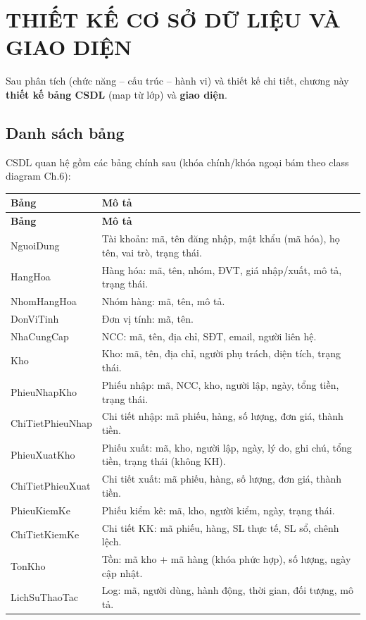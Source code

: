 \chapter{THIẾT KẾ CƠ SỞ DỮ LIỆU VÀ GIAO DIỆN}

Sau phân tích (chức năng -- cấu trúc -- hành vi) và thiết kế chi tiết, chương này \textbf{thiết kế bảng CSDL} (map từ lớp) và \textbf{giao diện}.

\section{Danh sách bảng}

CSDL quan hệ gồm các bảng chính sau (khóa chính/khóa ngoại bám theo class diagram Ch.6):

\begin{longtable}{|p{3.5cm}|p{9.5cm}|}
\hline
\textbf{Bảng} & \textbf{Mô tả} \\
\hline
\endfirsthead
\hline
\textbf{Bảng} & \textbf{Mô tả} \\
\hline
\endhead
NguoiDung & Tài khoản: mã, tên đăng nhập, mật khẩu (mã hóa), họ tên, vai trò, trạng thái. \\
\hline
HangHoa & Hàng hóa: mã, tên, nhóm, ĐVT, giá nhập/xuất, mô tả, trạng thái. \\
\hline
NhomHangHoa & Nhóm hàng: mã, tên, mô tả. \\
\hline
DonViTinh & Đơn vị tính: mã, tên. \\
\hline
NhaCungCap & NCC: mã, tên, địa chỉ, SĐT, email, người liên hệ. \\
\hline
Kho & Kho: mã, tên, địa chỉ, người phụ trách, diện tích, trạng thái. \\
\hline
PhieuNhapKho & Phiếu nhập: mã, NCC, kho, người lập, ngày, tổng tiền, trạng thái. \\
\hline
ChiTietPhieuNhap & Chi tiết nhập: mã phiếu, hàng, số lượng, đơn giá, thành tiền. \\
\hline
PhieuXuatKho & Phiếu xuất: mã, kho, người lập, ngày, lý do, ghi chú, tổng tiền, trạng thái (không KH). \\
\hline
ChiTietPhieuXuat & Chi tiết xuất: mã phiếu, hàng, số lượng, đơn giá, thành tiền. \\
\hline
PhieuKiemKe & Phiếu kiểm kê: mã, kho, người kiểm, ngày, trạng thái. \\
\hline
ChiTietKiemKe & Chi tiết KK: mã phiếu, hàng, SL thực tế, SL sổ, chênh lệch. \\
\hline
TonKho & Tồn: mã kho + mã hàng (khóa phức hợp), số lượng, ngày cập nhật. \\
\hline
LichSuThaoTac & Log: mã, người dùng, hành động, thời gian, đối tượng, mô tả. \\
\hline
\end{longtable}

